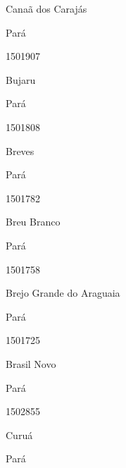\documentclass[
  letterpaper,
]{report}
\begin{document}
Canaã dos Carajás

\n    

\n    

\n      

Pará

\n      

1501907

\n      

Bujaru

\n    

\n    

\n      

Pará

\n      

1501808

\n      

Breves

\n    

\n    

\n      

Pará

\n      

1501782

\n      

Breu Branco

\n    

\n    

\n      

Pará

\n      

1501758

\n      

Brejo Grande do Araguaia

\n    

\n    

\n      

Pará

\n      

1501725

\n      

Brasil Novo

\n    

\n    

\n      

Pará

\n      

1502855

\n      

Curuá

\n    

\n    

\n      

Pará
\end{document}
